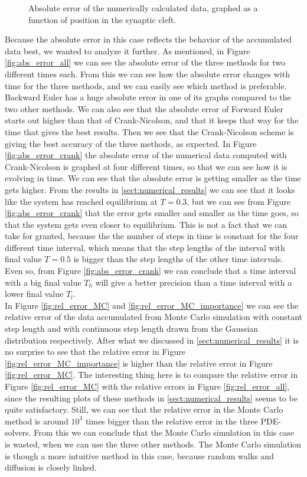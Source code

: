 \documentclass[12pt]{article}
\begin{document}
\begin{flushleft}
\begin{figure}[!h]
\begin{minipage}{\linewidth}
    \caption{Absolute error of the numerically calculated data, graphed as a function of position in the synaptic cleft.}
  \end{minipage}
\end{figure}
\newpage
Because the absolute error in this case reflects the behavior of the accumulated data best, we wanted to analyze it further. As mentioned, in Figure \ref{fig:abs_error_all} we can see the absolute error of the three methods for two different times each. From this we can see how the absolute error changes with time for the three methods, and we can easily see which method is preferable. Backward Euler has a huge absolute error in one of its graphs compared to the two other methods. We can also see that the absolute error of Forward Euler starts out higher than that of Crank-Nicolson, and that it keeps that way for the time that gives the best results. Then we see that the Crank-Nicolson scheme is giving the best accuracy of the three methods, as expected. In Figure \ref{fig:abs_error_crank} the absolute error of the numerical data computed with Crank-Nicolson is graphed at four different times, so that we can see how it is evolving in time. We can see that the absolute error is getting smaller as the time gets higher. From the results in \ref{sect:numerical_results} we can see that it looks like the system has reached equilibrium at $T=0.3$, but we can see from Figure \ref{fig:abs_error_crank} that the error gets smaller and smaller as the time goes, so that the system gets even closer to equilibrium. This is not a fact that we can take for granted, because the the number of steps in time is constant for the four different time interval, which means that the step lengths of the interval with final value $T = 0.5$ is bigger than the step lengths of the other time intervals. Even so, from Figure \ref{fig:abs_error_crank} we can conclude that a time interval with a big final value $T_h$ will give a better precision than a time interval with a lower final value $T_l$.  \\
\vspace{5mm}
In Figure \ref{fig:rel_error_MC} and \ref{fig:rel_error_MC_importance} we can see the relative error of the data accumulated from Monte Carlo simulation with constant step length and with continuous step length drawn from the Gaussian distribution respectively. After what we discussed in \ref{sect:numerical_results} it is no surprise to see that the relative error in Figure \ref{fig:rel_error_MC_importance} is higher than the relative error in Figure \ref{fig:rel_error_MC}. The interesting thing here is to compare the relative error in Figure \ref{fig:rel_error_MC} with the relative errors in Figure \ref{fig:rel_error_all}, since the resulting plots of these methods in \ref{sect:numerical_results} seems to be quite satisfactory. Still, we can see that the relative error in the Monte Carlo method is around $10^3$ times bigger than the relative error in the three PDE-solvers. From this we can conclude that the Monte Carlo simulation in this case is wasted, when we can use the three other methods. The Monte Carlo simulation is though a more intuitive method in this case, because random walks and diffusion is closely linked.  



\end{flushleft}
\end{document}
